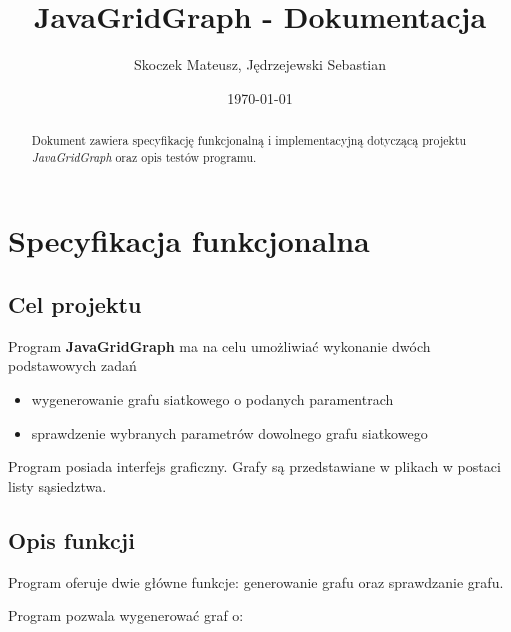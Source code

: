\documentclass[11pt,a4paper]{report}
\title{\Huge JavaGridGraph - Dokumentacja}
\author{Skoczek Mateusz, Jędrzejewski Sebastian}
\date{\today}
\begin{document}
    \maketitle
        




    \begin{abstract}
        Dokument zawiera specyfikację funkcjonalną i implementacyjną dotyczącą projektu \textsl{JavaGridGraph} oraz opis testów programu.
    \end{abstract}





    \tableofcontents
    \thispagestyle{empty}





    \newpage
    \chapter{Specyfikacja funkcjonalna}




    \newpage
    \section{Cel projektu}

    Program \textbf{JavaGridGraph} ma na celu umożliwiać wykonanie dwóch podstawowych zadań

    \begin{itemize}
        \item wygenerowanie grafu siatkowego o podanych paramentrach
        \item sprawdzenie wybranych parametrów dowolnego grafu siatkowego
    \end{itemize}

    Program posiada interfejs graficzny. Grafy są przedstawiane w plikach w postaci listy sąsiedztwa.




    \newpage
    \section{Opis funkcji}

    Program oferuje dwie główne funkcje: generowanie grafu oraz sprawdzanie grafu.

    \vspace{4em}

    Program pozwala wygenerować graf o:
    
\end{document}
